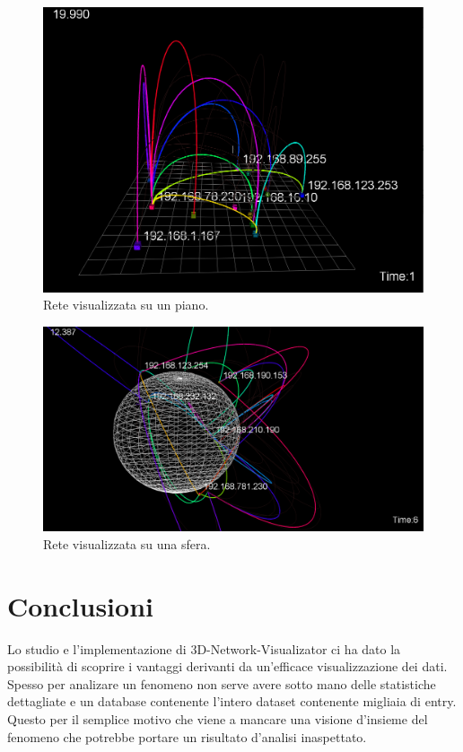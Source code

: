 \documentclass[a4paper,12pt]{article}
\begin{document}
\begin{figure}[htb!]
 \begin{center}
  \includegraphics[width=\textwidth]{images/image4.png}
 \end{center}
 \caption{Rete visualizzata su un piano.}
 \label{fig:piano}
\end{figure}

\begin{figure}[htb!]
 \begin{center}
  \includegraphics[width=\textwidth]{images/image5.png}
 \end{center}
 \caption{Rete visualizzata su una sfera.}
 \label{fig:sfera}
\end{figure}

\section{Conclusioni}
Lo studio e l'implementazione di 3D-Network-Visualizator ci ha dato la possibilit\`a di scoprire i vantaggi derivanti da un'efficace visualizzazione dei dati. Spesso per analizare un fenomeno non serve avere sotto mano delle statistiche dettagliate e un database contenente l'intero dataset contenente migliaia di entry. Questo per il semplice motivo che viene a mancare una visione d'insieme del fenomeno che potrebbe portare un risultato d'analisi inaspettato.
\end{document}
